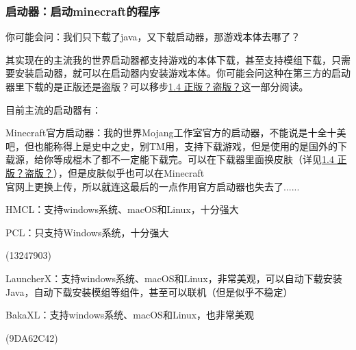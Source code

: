 \documentclass[UTF8,a4paper]{article}
\begin{document}
			\subsubsection{启动器：启动minecraft的程序}
				\hypertarget{qidongqi}{}
				\par 你可能会问：我们只下载了java，又下载启动器，那游戏本体去哪了？
				\par 其实现在的主流我的世界启动器都支持游戏的本体下载，甚至支持模组下载，只需要安装启动器，就可以在启动器内安装游戏本体。你可能会问这种在第三方的启动器里下载的是正版还是盗版？可以移步\hyperlink{zhengbandaoban}{1.4 正版？盗版？}这一部分阅读。
				\par 目前主流的启动器有：
				\par Minecraft官方启动器：我的世界Mojang工作室官方的启动器，不能说是十全十美吧，但也能称得上是史中之史，别TM用，支持下载游戏，但是使用的是国外的下载源，给你等成棍木了都不一定能下载完。可以在下载器里面换皮肤（详见\hyperlink{zhengbandaoban}{1.4 正版？盗版？}），但是皮肤似乎也可以在Minecraft \\ 官网上更换上传，所以就连这最后的一点作用官方启动器也失去了......
				\par HMCL：支持windows系统、macOS和Linux，十分强大
				\par PCL：只支持Windows系统，十分强大
				\begin{flushright}(13247903)\end{flushright}
				\par LauncherX：支持windows系统、macOS和Linux，非常美观，可以自动下载安装Java，自动下载安装模组等组件，甚至可以联机（但是似乎不稳定）
				\par BakaXL：支持windows系统、macOS和Linux，也非常美观
				\begin{flushright}(9DA62C42)\end{flushright}
\end{document}
